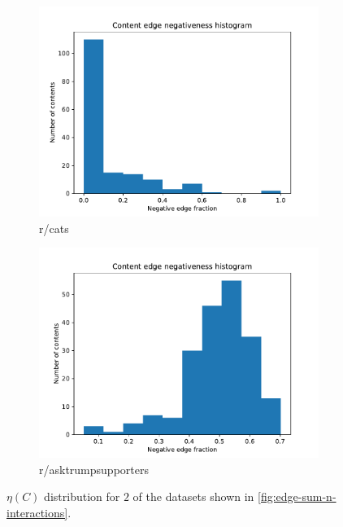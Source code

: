 \begin{figure}
	\begin{center}
		\begin{subfigure}[b]{0.4\textwidth}
			\centering
			\includegraphics[width=\textwidth]{tex/out/cats200/neg-fraction-content-hist.pdf}
			\caption{r/cats}
			\label{fig:tex/out/cats200/neg-fraction-content-hist.pdf}
		\end{subfigure}
		\begin{subfigure}[b]{0.4\textwidth}
			\centering
			\includegraphics[width=\textwidth]{tex/out/asktrumpsupporters200/neg-fraction-content-hist.pdf}
			\caption{r/asktrumpsupporters}
			\label{fig:asktrump-hist-eta}
		\end{subfigure}
	\end{center}
	\caption{$\eta(C)$ distribution for $2$ of the datasets shown in
		\autoref{fig:edge-sum-n-interactions}.}
	\label{fig:eta-distribution-content}
\end{figure}

